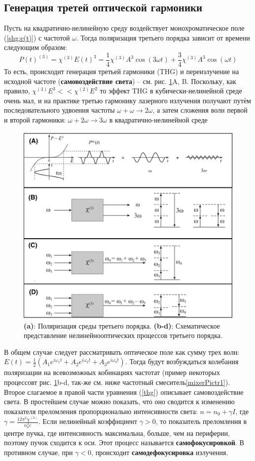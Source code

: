 \subsection*{Генерация третей оптической гармоники} 
Пусть на квадратично-нелинейную среду воздействует монохроматическое поле (\ref{shg:e(t)}) с частотой $\omega$. Тогда поляризация третьего порядка зависит от времени следующим образом:
\begin{equation}\label{thg}
P(t)^{(3)} = \chi^{(3)}E(t)^3 = \frac{1}{4}\chi^{(3)}A^3\cos(3\omega t) + \frac{3}{4}\chi^{(3)}A^3\cos(\omega t)
\end{equation}
То есть, происходит генерация третьей гармоники (THG) и переизлучение на исходной частоте (\textbf{самовоздействие света}) – см. рис. \ref{thg1}A, B. Поскольку, как правило, $\chi^{(3)}E^3 << \chi^{(2)}E^2$ то эффект THG в кубически-нелинейной среде очень мал, и на практике третью гармонику лазерного излучения получают путѐм последовательного удвоения частоты $\omega +  \omega \rightarrow 2\omega$, а затем сложения волн первой и второй гармоники: $\omega +  2\omega \rightarrow 3\omega$ в квадратично-нелинейной среде
\begin{figure}[h]
	\centering
	\includegraphics[width=0.8\linewidth]{images/thg.png}
	\caption{\textbf{(a)}: Поляризация среды третьего порядка. \textbf{(b-d)}: Схематическое представление нелинейнооптических процессов третьего порядка.}
	\label{thg1}
\end{figure}
В общем случае следует рассматривать оптическое поле как сумму трех волн: $E(t) = \frac{1}{2}(A_1e^{i\omega_1 t} + A_2e^{i\omega_2 t} + A_3e^{i\omega_3 t})$. Тогда будут возбуждаться колебания поляризации на всевозможных кобинациях частотат (пример некоторых процессовт рис. \ref{thg1}b-d, так-же см. ниже частотный смеситель\ref{mixerPictr1}). Второе слагаемое в правой части уравнения (\ref{thg}) описывает самовоздействие света. В простейшем случае можно показать, что оно сводится к изменению показателя преломления пропорционально интенсивности света: $n = n_0 + \gamma I$, где $ \gamma = \frac{12\pi^2 \chi^{(3)}}{n_{0}^{2}c} $. Если нелинейный коэффициент $\gamma > 0$, то показатель преломления в центре пучка, где интенсивность максимальна, больше, чем на периферии, поэтому пучок сходится к оси. Этот процесс называется \textbf{самофокусировкой}. В противном случае, при $\gamma < 0$, происходит \textbf{самодефокусировка} излучения. 